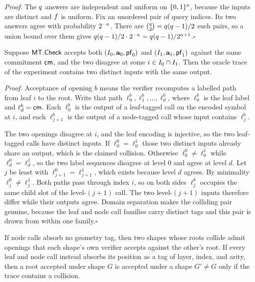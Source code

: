 \noindent\emph{Proof.}
The $q$ answers are independent and uniform on $\{0,1\}^{\kappa}$, because
the inputs are distinct and $f$ is uniform.  Fix an unordered pair of query
indices.  Its two answers agree with probability $2^{-\kappa}$.  There are
$\binom{q}{2}=q(q-1)/2$ such pairs, so a union bound
over them gives
$q(q-1)/2\cdot2^{-\kappa}
=q(q-1)/2^{\kappa+1}$.\hfill$\square$

\begin{lemma}\label{lem:extract}
Suppose $\mathsf{MT}.\mathsf{Check}$ accepts both $(I_0,\mathbf{a}_0,\mathsf{pf}_0)$ and
$(I_1,\mathbf{a}_1,\mathsf{pf}_1)$ against the same commitment $\mathsf{cm}$, and
the two disagree at some $i\in I_0\cap I_1$.  Then the oracle trace of the
experiment contains two distinct inputs with the same output.
\end{lemma}

\noindent\emph{Proof.}
Acceptance of opening $b$ means the verifier recomputes a labelled path from leaf $i$ to
the root.  Write that path $\ell_0^b,\ell_1^b,\dots,\ell_d^b$, where $\ell_0^b$ is the
leaf label and $\ell_d^b=\mathsf{cm}$.  Each $\ell_0^b$ is the output of a leaf-tagged call on
the encoded symbol at $i$, and each $\ell_{j+1}^b$ is the output of a node-tagged call
whose input contains $\ell_j^b$.

The two openings disagree at $i$, and the leaf encoding is injective, so the two
leaf-tagged calls have distinct inputs.  If $\ell_0^0=\ell_0^1$ those two distinct
inputs already share an output, which is the claimed collision.  Otherwise
$\ell_0^0\neq\ell_0^1$ while $\ell_d^0=\ell_d^1$, so the two label sequences disagree at
level $0$ and agree at level $d$.  Let $j$ be least with $\ell_{j+1}^0=\ell_{j+1}^1$,
which exists because level $d$ agrees.  By minimality $\ell_j^0\neq\ell_j^1$.  Both
paths pass through index $i$, so on both sides $\ell_j^b$ occupies the same child slot of
the level-$(j+1)$ call.  The two level-$(j+1)$ inputs therefore differ while their
outputs agree.  Domain separation makes the colliding pair genuine, because the leaf and
node call families carry distinct tags and this pair is drawn from within one
family.\hfill$\square$

\begin{lemma}\label{lem:geometry}
If node calls absorb no geometry tag, then two shapes whose roots collide admit openings
that each shape's own verifier accepts against the other's root.  If every leaf and node
call instead absorbs its position as a tag of layer, index, and arity, then a root
accepted under shape $G$ is accepted under a shape $G'\neq G$ only if the trace contains
a collision.
\end{lemma}

